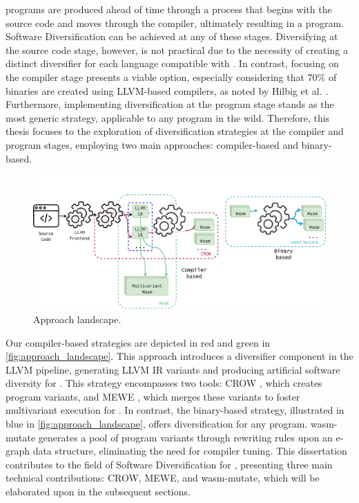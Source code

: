 


\Wasm programs are produced ahead of time through a process that begins with the source code and moves through the compiler, ultimately resulting in a \Wasm program. 
Software Diversification can be achieved at any of these stages. 
Diversifying at the source code stage, however, is not practical due to the necessity of creating a distinct diversifier for each language compatible with \Wasm. 
In contrast, focusing on the compiler stage presents a viable option, especially considering that 70\% of \Wasm binaries are created using LLVM-based compilers, as noted by Hilbig et al. \cite{Hilbig2021AnES}. 
Furthermore, implementing diversification at the \Wasm program stage stands as the most generic strategy, applicable to any \Wasm program in the wild. 
Therefore, this thesis focuses to the exploration of diversification strategies at the compiler and \Wasm program stages, employing two main approaches: compiler-based and binary-based.


\begin{figure}[h]
	\centering
	\includegraphics[width=1.0\textwidth]{figures/landscape.pdf}
	\caption{Approach landscape.}
	\label{fig:approach_landscape}
\end{figure}

Our compiler-based strategies are depicted in red and green in \autoref{fig:approach_landscape}. 
This approach introduces a diversifier component in the LLVM pipeline, generating LLVM IR variants and producing artificial software diversity for \wasm. 
This strategy encompasses two tools: CROW \cite{CROW}, which creates \wasm program variants, and MEWE \cite{MEWE}, which merges these variants to foster multivariant execution for \wasm.
In contrast, the binary-based strategy, illustrated in blue in \autoref{fig:approach_landscape}, offers diversification for any \Wasm program. 
wasm-mutate \cite{wasm-mutate} generates a pool of \Wasm program variants through rewriting rules upon an e-graph \cite{e-graph} data structure, eliminating the need for compiler tuning.
This dissertation contributes to the field of Software Diversification for \Wasm, presenting three main technical contributions: CROW, MEWE, and wasm-mutate, which will be elaborated upon in the subsequent sections.

